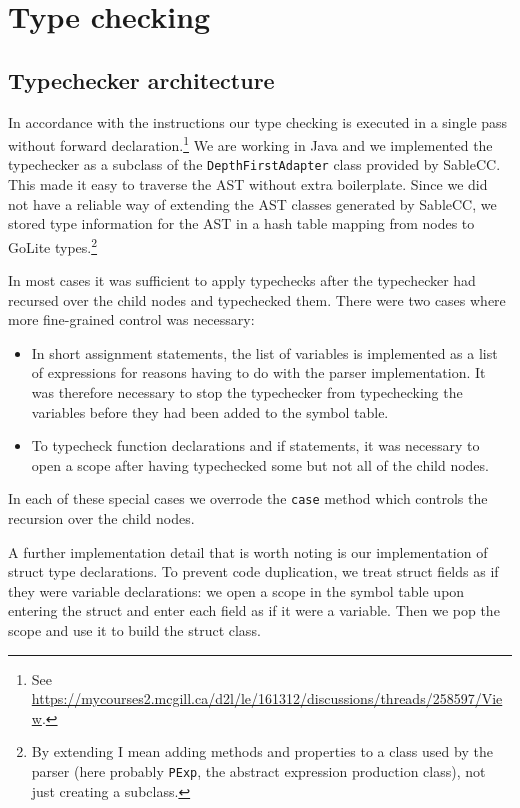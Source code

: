 \documentclass[oneside]{article}
\begin{document}
\section{Type checking}
\subsection{Typechecker architecture}

In accordance with the instructions our type checking is executed in a single pass without forward declaration.\footnote{See \url{https://mycourses2.mcgill.ca/d2l/le/161312/discussions/threads/258597/View}.} We are working in Java and we implemented the typechecker as a subclass of the \verb|DepthFirstAdapter| class provided by SableCC. This made it easy to traverse the AST without extra boilerplate. Since we did not have a reliable way of extending the AST classes generated by SableCC, we stored type information for the AST in a hash table mapping from nodes to GoLite types.\footnote{By extending I mean adding methods and properties to a class used by the parser (here probably \texttt{PExp}, the abstract expression production class), not just creating a subclass.}

In most cases it was sufficient to apply typechecks after the typechecker had recursed over the child nodes and typechecked them. There were two cases where more fine-grained control was necessary:

\begin{itemize}
    \item In short assignment statements, the list of variables is implemented as a list of expressions for reasons having to do with the parser implementation. It was therefore necessary to stop the typechecker from typechecking the variables before they had been added to the symbol table.
    \item To typecheck function declarations and if statements, it was necessary to open a scope after having typechecked some but not all of the child nodes.
\end{itemize}

In each of these special cases we overrode the \verb|case| method which controls the recursion over the child nodes.

A further implementation detail that is worth noting is our implementation of struct type declarations. To prevent code duplication, we treat struct fields as if they were variable declarations: we open a scope in the symbol table upon entering the struct and enter each field as if it were a variable. Then we pop the scope and use it to build the struct class.
\end{document}
